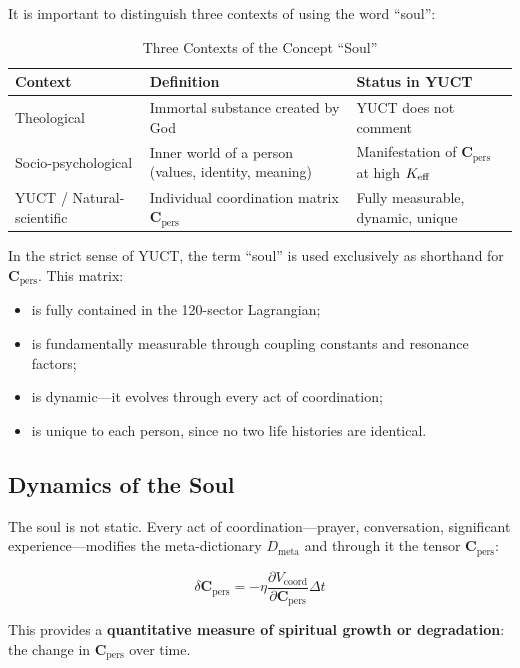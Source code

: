 \documentclass[12pt,a4paper]{article}
\newcommand{\Cpers}{\mathbf{C}_{\text{pers}}}
\begin{document}
	It is important to distinguish three contexts of using the word ``soul'':
	
	\begin{table}[H]
		\centering
		\caption{Three Contexts of the Concept ``Soul''}
		\label{tab:soul-contexts}
		\begin{tabular}{p{3.5cm}p{5cm}p{5cm}}
			\toprule
			\textbf{Context} & \textbf{Definition} & \textbf{Status in YUCT} \\
			\midrule
			Theological & Immortal substance created by God & YUCT does not comment \\
			Socio-psychological & Inner world of a person (values, identity, meaning) & Manifestation of \(\Cpers\) at high \(\Keff\) \\
			YUCT / Natural-scientific & Individual coordination matrix \(\Cpers\) & Fully measurable, dynamic, unique \\
			\bottomrule
		\end{tabular}
	\end{table}
	
	In the strict sense of YUCT, the term ``soul'' is used exclusively as shorthand for \(\Cpers\). This matrix:
	\begin{itemize}
		\item is fully contained in the 120-sector Lagrangian;
		\item is fundamentally measurable through coupling constants and resonance factors;
		\item is dynamic—it evolves through every act of coordination;
		\item is unique to each person, since no two life histories are identical.
	\end{itemize}
	
	\subsection{Dynamics of the Soul}
	
	The soul is not static. Every act of coordination—prayer, conversation, significant experience—modifies the meta-dictionary \(D_{\text{meta}}\) and through it the tensor \(\Cpers\):
	
	\begin{equation}
		\delta \Cpers = -\eta \frac{\partial V_{\text{coord}}}{\partial \Cpers} \Delta t
	\end{equation}
	
	This provides a \textbf{quantitative measure of spiritual growth or degradation}: the change in \(\Cpers\) over time.
	
\end{document}
